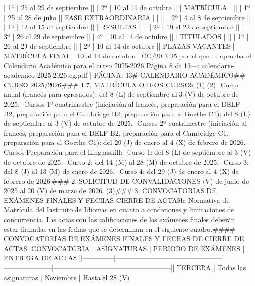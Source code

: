 \documentclass{article}
\begin{document}
\begin{itemize}
{| 1º                          | 26 al 29 de septiembre       |\n|                                | 2º                          | 10 al 14 de octubre         |\n|                                | MATRÍCULA                   |                             |\n|                                | 1º                          | 25 al 28 de julio           |\n| FASE EXTRAORDINARIA           |                             |                             |\n|                                | 2º                          | 4 al 8 de septiembre        |\n|                                | 1º                          | 12 al 15 de septiembre       |\n|                                | RESULTAS                    |                             |\n|                                | 2º                          | 19 al 22 de septiembre       |\n|                                | 3º                          | 26 al 29 de septiembre       |\n|                                | 4º                          | 10 al 14 de octubre         |\n|                                | TITULADOS                   |                             |\n|                                | 1º                          | 26 al 29 de septiembre       |\n|                                | 2º                          | 10 al 14 de octubre         |\n| PLAZAS VACANTES               | MATRÍCULA FINAL             | 10 al 14 de octubre         |\n{} CG/20-3-25 por el que se aprueba el Calendario Académico para el curso 2025-2026  Página 8 de 13\n\n---\n\nFUENTE: calendario-academico-2025-2026-cg.pdf | PÁGINA: 13\n# CALENDARIO ACADÉMICO\n## CURSO 2025/2026\n\n### 1.7. MATRÍCULA OTROS CURSOS (1) (2)\n\n- Curso anual (francés para egresados): del 8 (L) de septiembre al 3 (V) de octubre de 2025.\n- Cursos 1º cuatrimestre (iniciación al francés, preparación para el DELF B2, preparación para el Cambridge B2, preparación para el Goethe C1): del 8 (L) de septiembre al 3 (V) de octubre de 2025.\n- Cursos 2º cuatrimestre (iniciación al francés, preparación para el DELF B2, preparación para el Cambridge C1, preparación para el Goethe C1): del 29 (J) de enero al 4 (X) de febrero de 2026.\n- Cursos Preparación para el Linguaskill:\n- Curso 1: del 8 (L) de septiembre al 3 (V) de octubre de 2025.\n- Curso 2: del 14 (M) al 28 (M) de octubre de 2025.\n- Curso 3: del 8 (J) al 13 (M) de enero de 2026.\n- Curso 4: del 29 (J) de enero al 4 (X) de febrero de 2026.\n\n### 2. SOLICITUD DE CONVALIDACIONES\n{} (V) de junio de 2025 al 20 (V) de marzo de 2026. (3)\n\n### 3. CONVOCATORIAS DE EXÁMENES FINALES Y FECHAS CIERRE DE ACTAS\n{} la Normativa de Matrícula del Instituto de Idiomas en cuanto a condiciones y limitaciones de concurrencia. Las actas con las calificaciones de los exámenes finales deberán estar firmadas en las fechas que se determinan en el siguiente cuadro.\n\n#### CONVOCATORIAS DE EXÁMENES FINALES Y FECHAS DE CIERRE DE ACTAS\n\n| CONVOCATORIA | ASIGNATURAS                                   | PERIODO DE EXÁMENES | ENTREGA DE ACTAS                                   |\n|--------------|-----------------------------------------------|---------------------|---------------------------------------------------|\n| TERCERA      | Todas las asignaturas                         | Noviembre           | Hasta el 28 (V) }
\end{itemize}
\end{document}
